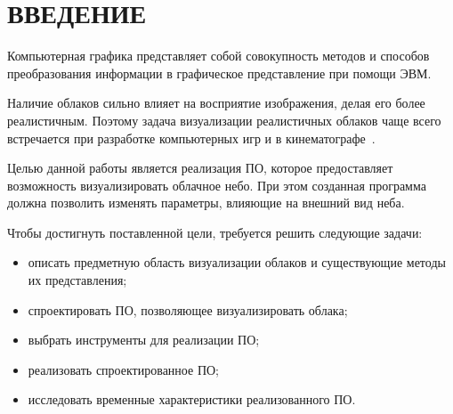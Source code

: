 \chapter*{ВВЕДЕНИЕ}

Компьютерная графика представляет собой совокупность методов
и способов преобразования информации в графическое представление при
помощи ЭВМ.

Наличие облаков сильно влияет на восприятие изображения, делая его более реалистичным. Поэтому задача визуализации реалистичных облаков чаще всего встречается при разработке компьютерных игр и в кинематографе~\cite{oz, hzd, frostbite}. 

Целью данной работы является реализация ПО, которое предоставляет возможность визуализировать облачное небо. При этом созданная программа должна позволить изменять параметры, влияющие на внешний вид неба.

Чтобы достигнуть поставленной цели, требуется решить следующие задачи:

\begin{itemize}
	\item описать предметную область визуализации облаков и существующие методы их представления;
	\item спроектировать ПО, позволяющее визуализировать облака;
	\item выбрать инструменты для реализации ПО;
	\item реализовать спроектированное ПО;
	\item исследовать временные характеристики реализованного ПО.
\end{itemize}